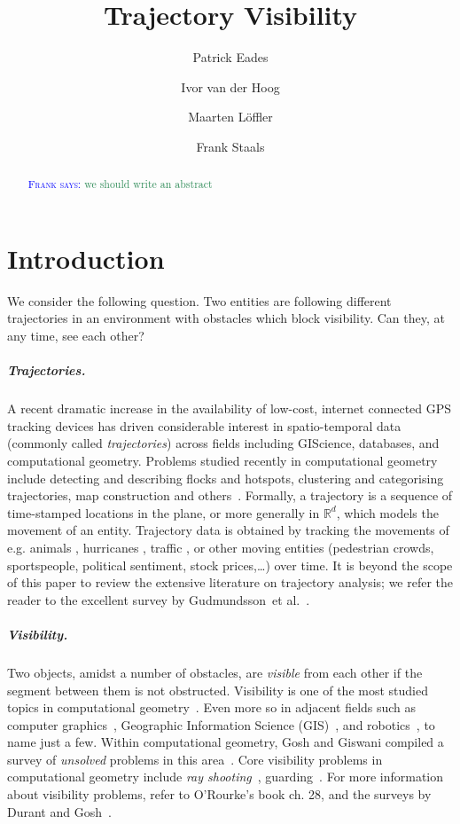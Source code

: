 \documentclass[UKenglish]{lipics-v2019}
\title{Trajectory Visibility}
\author{Patrick Eades}{University of Sydney}{patrick.eades@sydney.edu.au}{}{}
\author{Ivor van der Hoog}{Utrecht University}{i.d.vanderhoog@uu.nl}{}{}
\author{Maarten Löffler}{Utrecht University}{m.loffler@uu.nl}{}{}
\author{Frank Staals}{Utrecht University}{f.staals@uu.nl}{}{}
\newcommand{\myremark}[4]{\textcolor{blue}{\textsc{#1 #2:}} \textcolor{#4}{\textsf{#3}}}
\newcommand{\frank}[2][says]{\myremark{Frank}{#1}{#2}{SeaGreen}}
\newcommand{\etal}{\textnormal{et al.}\xspace}
\newcommand{\mkmbb}[1]{\ensuremath{\mathbb{#1}}\xspace}
\newcommand{\R}{\mkmbb{R}}
\begin{document}
\maketitle

\begin{abstract}
  \frank{we should write an abstract}
\end{abstract}





\newpage


\section {Introduction}

We consider the following question. Two entities are following different trajectories in an environment with obstacles which block visibility. Can they, at any time, see each other? 

\subparagraph {Trajectories.}

A recent dramatic increase in the availability of low-cost, internet connected GPS tracking devices has driven considerable interest in spatio-temporal data (commonly called {\em trajectories}) across fields including GIScience, databases, and computational geometry. 
Problems studied recently in computational geometry include detecting and describing flocks \cite{AnderssonGLW07, BenkertGHW08, LaubeKI04} and hotspots, clustering and categorising trajectories, map construction and others~\cite{bbgll-dcpcs-11,grsc-pcecu-07,gs-tcmrm-99,lhw-tc-07,vgk-dsmt-02}.
Formally, a trajectory is a 
sequence of time-stamped locations 
in the plane, or more generally in $\R^d$, which
models the movement of an entity.
Trajectory data is obtained by tracking the movements of e.g. animals \cite{BovetB88,Calenge200934,gal-nmibc-09}, hurricanes \cite{Stohl1998947}, traffic \cite{lltx-dftf-10}, or other moving entities \cite{dwf-rpm-09} (pedestrian crowds, sportspeople, political sentiment, stock prices,\ldots) over time.
It is beyond the scope of this paper to review the extensive literature on trajectory analysis; we refer the reader to the excellent survey by Gudmundsson~\etal~\cite{GudmundssonLW17}.

\subparagraph {Visibility.}
Two objects, amidst a number of obstacles, are \emph{visible} from each other if the segment between them is not obstructed. 
Visibility is one of the most studied topics in computational geometry~\cite {moet,welzl1985constructing,POCCHIOLA1996279}. 
Even more so in adjacent fields such as computer graphics~\cite {Durand00amultidisciplinary}, Geographic Information Science (GIS)~\cite{FM03}, and robotics~\cite {moet}, to name just a few.
Within computational geometry, Gosh and Giswani compiled a survey of {\em unsolved} problems in this area~\cite {Ghosh:2013:UPV:2543581.2543589}.
Core visibility problems in computational geometry include {\em ray shooting}~\cite{10,13,17,20}, guarding~\cite {Chvatal75,Fisk78,survey}.
For more information about visibility problems, refer to O'Rourke's book \cite{ORourke87} ch. 28, and the surveys by Durant \cite{durand2000multidisciplinary} and Gosh~\cite{Ghosh:2013:UPV:2543581.2543589}. 
\end{document}
